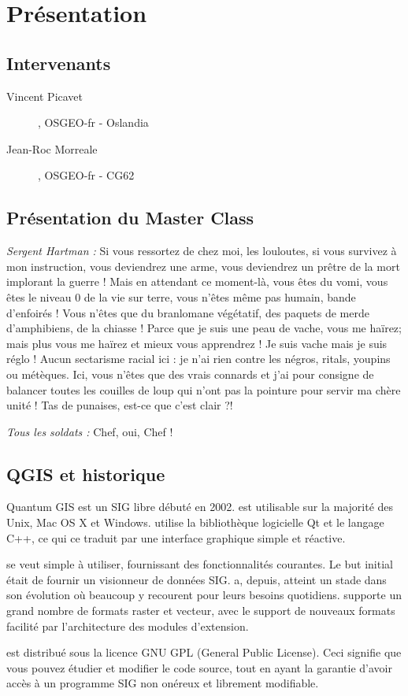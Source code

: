 \mainmatter
\pagestyle{scrheadings}

\chapter{Présentation}\label{sec:qgis_presentation}

\section{Intervenants}

\begin{description}
\item[Vincent Picavet], OSGEO-fr - Oslandia
\item[Jean-Roc Morreale], OSGEO-fr - CG62
\end{description}

\section{Présentation du Master Class}

\textit{Sergent Hartman :} Si vous ressortez de chez moi, les louloutes, si vous survivez à mon instruction, vous deviendrez une arme, vous deviendrez un prêtre de la mort implorant la guerre ! Mais en attendant ce moment-là, vous êtes du vomi, vous êtes le niveau 0 de la vie sur terre, vous n'êtes même pas humain, bande d'enfoirés ! Vous n'êtes que du branlomane végétatif, des paquets de merde d'amphibiens, de la chiasse ! Parce que je suis une peau de vache, vous me haïrez; mais plus vous me haïrez et mieux vous apprendrez ! Je suis vache mais je suis réglo ! Aucun sectarisme racial ici : je n'ai rien contre les négros, ritals, youpins ou métèques. Ici, vous n'êtes que des vrais connards et j'ai pour consigne de balancer toutes les couilles de loup qui n'ont pas la pointure pour servir ma chère unité ! Tas de punaises, est-ce que c'est clair ?!

\textit{Tous les soldats :} Chef, oui, Chef !

\section{QGIS et historique}

Quantum GIS est un SIG libre débuté en 2002. \qg est utilisable sur la majorité des Unix, Mac OS X et Windows. \qg utilise la bibliothèque logicielle Qt et le langage C++, ce qui ce traduit par une interface graphique simple et réactive.

\qg se veut simple à utiliser, fournissant des fonctionnalités courantes. Le but initial était de fournir un visionneur de données SIG. \qg a, depuis, atteint un stade dans son évolution où beaucoup y recourent pour leurs besoins quotidiens. \qg supporte un grand nombre de formats raster et vecteur, avec le support de nouveaux formats facilité par l'architecture des modules d'extension.

\qg est distribué sous la licence GNU GPL (General Public License). Ceci signifie que vous pouvez étudier et modifier le code source, tout en ayant la garantie d'avoir accès à un programme SIG non onéreux et librement modifiable.